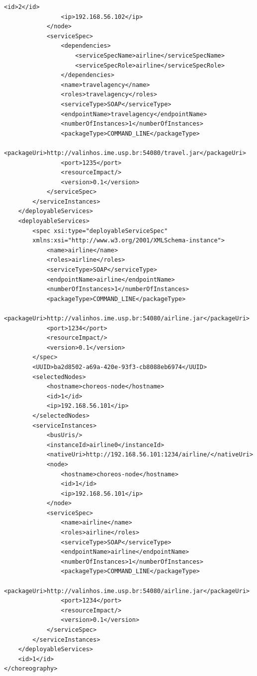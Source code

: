 \documentclass[a4paper, 10pt]{article}
\begin{document}
{\begin{lstlisting}[caption=Choreography XML representation example, label=lst:chor_xml]
                <id>2</id>
                <ip>192.168.56.102</ip>
            </node>
            <serviceSpec>
                <dependencies>
                    <serviceSpecName>airline</serviceSpecName>
                    <serviceSpecRole>airline</serviceSpecRole>
                </dependencies>
                <name>travelagency</name>
                <roles>travelagency</roles>
                <serviceType>SOAP</serviceType>
                <endpointName>travelagency</endpointName>
                <numberOfInstances>1</numberOfInstances>
                <packageType>COMMAND_LINE</packageType>
                <packageUri>http://valinhos.ime.usp.br:54080/travel.jar</packageUri>
                <port>1235</port>
                <resourceImpact/>
                <version>0.1</version>
            </serviceSpec>
        </serviceInstances>
    </deployableServices>
    <deployableServices>
        <spec xsi:type="deployableServiceSpec" 
        xmlns:xsi="http://www.w3.org/2001/XMLSchema-instance">
            <name>airline</name>
            <roles>airline</roles>
            <serviceType>SOAP</serviceType>
            <endpointName>airline</endpointName>
            <numberOfInstances>1</numberOfInstances>
            <packageType>COMMAND_LINE</packageType>
            <packageUri>http://valinhos.ime.usp.br:54080/airline.jar</packageUri>
            <port>1234</port>
            <resourceImpact/>
            <version>0.1</version>
        </spec>
        <UUID>ba2d8502-a69a-420e-93f3-cb8088eb6974</UUID>
        <selectedNodes>
            <hostname>choreos-node</hostname>
            <id>1</id>
            <ip>192.168.56.101</ip>
        </selectedNodes>
        <serviceInstances>
            <busUris/>
            <instanceId>airline0</instanceId>
            <nativeUri>http://192.168.56.101:1234/airline/</nativeUri>
            <node>
                <hostname>choreos-node</hostname>
                <id>1</id>
                <ip>192.168.56.101</ip>
            </node>
            <serviceSpec>
                <name>airline</name>
                <roles>airline</roles>
                <serviceType>SOAP</serviceType>
                <endpointName>airline</endpointName>
                <numberOfInstances>1</numberOfInstances>
                <packageType>COMMAND_LINE</packageType>
                <packageUri>http://valinhos.ime.usp.br:54080/airline.jar</packageUri>
                <port>1234</port>
                <resourceImpact/>
                <version>0.1</version>
            </serviceSpec>
        </serviceInstances>
    </deployableServices>
    <id>1</id>
</choreography>
\end{lstlisting}

}
\end{document}
